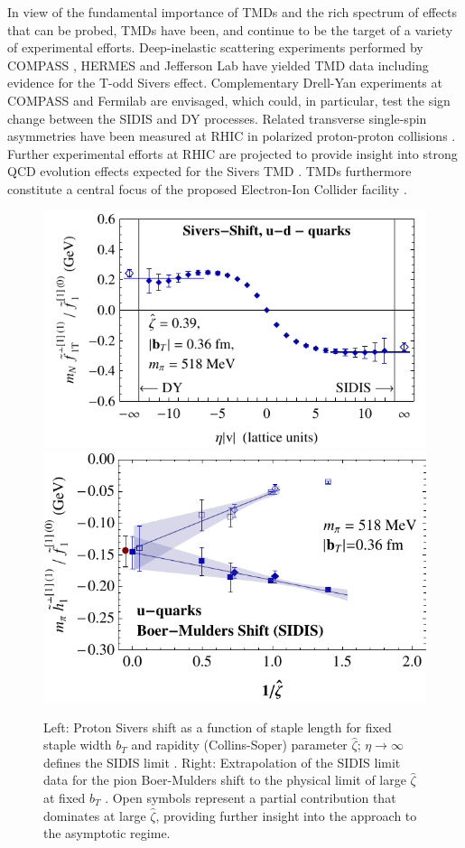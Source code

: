 In view of the fundamental importance of TMDs and the rich spectrum of
effects that can be probed, TMDs have been, and continue to be the
target of a variety of experimental efforts. Deep-inelastic scattering
experiments performed by COMPASS \cite{Alekseev:2008aa,Adolph:2014fjw},
HERMES \cite{Airapetian:2009ae,Airapetian:2013bim} and Jefferson Lab
\cite{Qian:2011py,Avakian:2010ae} have yielded TMD data including evidence
for the T-odd Sivers effect. Complementary Drell-Yan experiments at
COMPASS \cite{Gautheron:2010wva} and Fermilab \cite{Brown:2014sea} are
envisaged, which could, in particular, test the sign change between
the SIDIS and DY processes. Related transverse single-spin
asymmetries have been measured at RHIC in polarized proton-proton
collisions \cite{Adare:2013ekj,Adamczyk:2012xd}. Further experimental
efforts at RHIC are projected to provide insight into strong QCD evolution
effects expected for the Sivers TMD \cite{Echevarria:2014vda}.
TMDs furthermore constitute a central focus of the proposed Electron-Ion
Collider facility \cite{Accardi:2012qut}.

\begin{figure}[h!]
	\centering
	\includegraphics[width=0.474\columnwidth]{figures/m020_run38_UminusD_Sivers_lsqr-9_zetasqrlat4}\hspace{1cm}
	\includegraphics[width=0.45\columnwidth]{figures/new_bm_u_sidis_b0p36_vszetahat_extrap_pow1}
	\caption{Left: Proton Sivers shift as a function of staple length for fixed
		staple width $b_T $ and rapidity (Collins-Soper) parameter $\hat{\zeta } $;
		$\eta \rightarrow \infty $ defines the SIDIS limit \cite{Musch:2011er}.
		Right: Extrapolation of the SIDIS limit data for the pion Boer-Mulders
		shift to the physical limit of large $\hat{\zeta } $
		at fixed $b_T $ \cite{Engelhardt:2015xja}. Open symbols represent a partial
		contribution that dominates at large $\hat{\zeta } $, providing further
		insight into the approach to the asymptotic regime.}
	\label{fig_sidis}
\end{figure}

